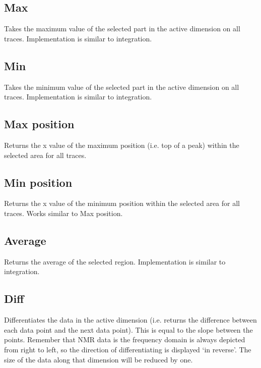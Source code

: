 \documentclass[11pt,a4paper]{article}
\begin{document}
\subsection{Max}
Takes the maximum value of the selected part in the active dimension on all traces.
Implementation is similar to integration.

\subsection{Min}
Takes the minimum value of the selected part in the active dimension on all traces.
Implementation is similar to integration.

\subsection{Max position}
Returns the x value of the maximum position (i.e. top of a peak) within the selected area for all traces.


\subsection{Min position}
Returns the x value of the minimum position within the selected area for all traces.
Works similar to Max position.

\subsection{Average}
Returns the average of the selected region. Implementation is similar to integration.

\subsection{Diff}
Differentiates the data in the active dimension (i.e. returns the difference between each data point and the next data point).
This is equal to the slope between the points.
Remember that NMR data is the frequency domain is always depicted from right to left, so the direction of differentiating is displayed `in reverse'.
The size of the data along that dimension will be reduced by one.
\end{document}
